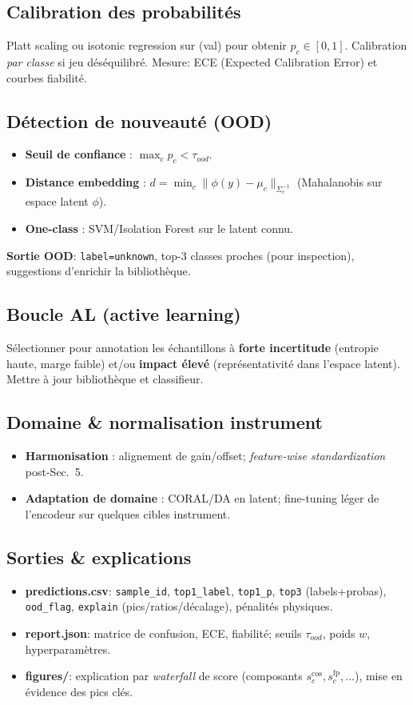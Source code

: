 \subsection{Calibration des probabilités}
Platt scaling ou isotonic regression sur (val) pour obtenir $p_c\in[0,1]$. Calibration \emph{par classe} si jeu déséquilibré. Mesure: ECE (Expected Calibration Error) et courbes fiabilité.

\subsection{Détection de nouveauté (OOD)}
\begin{itemize}[nosep]
\item \textbf{Seuil de confiance} : $\max_c p_c < \tau_{ood}$.
\item \textbf{Distance embedding} : $d=\min_c \|\phi(y)-\mu_c\|_{\Sigma_c^{-1}}$ (Mahalanobis sur espace latent $\phi$).
\item \textbf{One-class} : SVM/Isolation Forest sur le latent connu.
\end{itemize}
\textbf{Sortie OOD}: \texttt{label=unknown}, top-3 classes proches (pour inspection), suggestions d'enrichir la bibliothèque.

\subsection{Boucle AL (active learning)}
Sélectionner pour annotation les échantillons à \textbf{forte incertitude} (entropie haute, marge faible) et/ou \textbf{impact élevé} (représentativité dans l'espace latent). Mettre à jour bibliothèque et classifieur.

\subsection{Domaine \& normalisation instrument}
\begin{itemize}[nosep]
\item \textbf{Harmonisation} : alignement de gain/offset; \emph{feature-wise standardization} post-Sec.~5.
\item \textbf{Adaptation de domaine} : CORAL/DA en latent; fine-tuning léger de l'encodeur sur quelques cibles instrument.
\end{itemize}

\subsection{Sorties \& explications}
\begin{itemize}[nosep]
\item \textbf{predictions.csv}: \texttt{sample\_id}, \texttt{top1\_label}, \texttt{top1\_p}, \texttt{top3} (labels+probas), \texttt{ood\_flag}, \texttt{explain} (pics/ratios/décalage), pénalités physiques.
\item \textbf{report.json}: matrice de confusion, ECE, fiabilité; seuils $\tau_{ood}$, poids $w$, hyperparamètres.
\item \textbf{figures/}: explication par \emph{waterfall} de score (composants $s_c^{\cos}, s_c^{\mathrm{fp}}, \ldots$), mise en évidence des pics clés.
\end{itemize}

